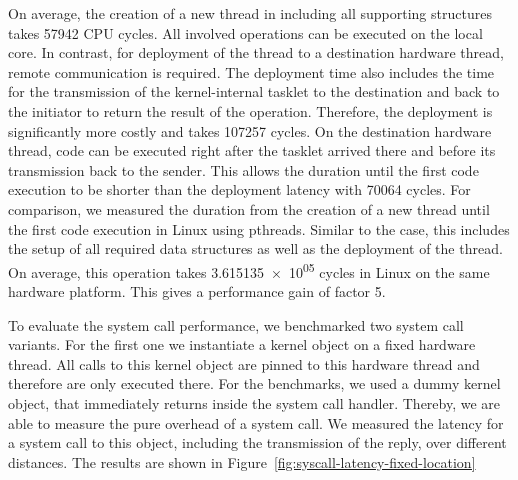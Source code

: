 On average, the creation of a new thread in \mythos including all supporting
structures takes \num{57942} CPU cycles. All involved operations can be executed
on the local core. In contrast, for deployment of the thread to a destination
hardware thread, remote communication is required. The deployment time also
includes the time for the transmission of the kernel-internal tasklet to the
destination and back to the initiator to return the result of the operation.
Therefore, the deployment is significantly more costly and takes \num{107257}
cycles.
On the destination hardware thread, code can be executed right after the tasklet
arrived there and before its transmission back to the sender. This allows the
duration until the first code execution to be shorter than the deployment
latency with \num{70064} cycles.
For comparison, we measured the duration from the creation of a new thread until
the first code execution in Linux using pthreads. Similar to the \mythos case,
this includes the setup of all required data structures as well as the
deployment of the thread. On average, this operation takes \num{3.615135e+05}
cycles in Linux on the same hardware platform. This gives \mythos a performance
gain of factor \num{5}.

To evaluate the system call performance, we benchmarked two system call variants. For the first one we instantiate a kernel object on a fixed hardware thread. All calls to this kernel object are pinned to this hardware thread and therefore are only executed there. For the benchmarks, we used a dummy kernel object, that immediately returns inside the system call handler. Thereby, we are able to measure the pure overhead of a system call. We measured the latency for a system call to this object, including the transmission of the reply, over different distances. The results are shown in Figure~\ref{fig:syscall-latency-fixed-location}


